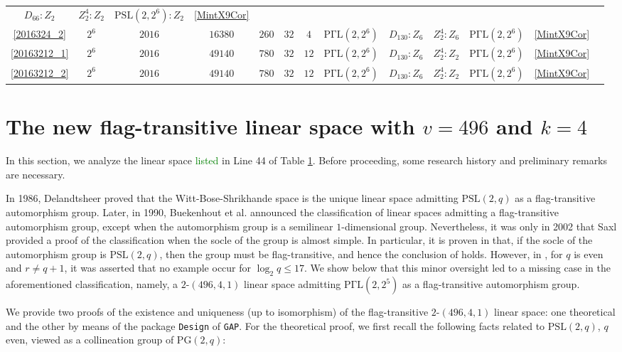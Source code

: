 \documentclass[a4paper,twopage,reqno,12pt]{amsart}
\theoremstyle{definition}
\numberwithin{equation}{section}
\newcommand{\PSL}{\mathrm{PSL}}
\newcommand{\PGaL}{\mathrm{P\Gamma L}}
\newcommand{\PG}{\mathrm{PG}}
\renewcommand{\leq}{\leqslant}
\begin{document}
\begin{table}
{\begin{tabular}{ccccccccccccc}
			$D_{66}:Z_{2}$ & $Z_{2}^{4}:Z_{2}$           & $\PSL(2,2^{6}):Z_{2}$    & \ref{MintX9Cor} \\
\ref{2016324_2}& $2 ^6$ & $2016$ & $16380$ & $260$ & $32$ & $4$      & $\PGaL(2,2^{6})$ & 
			$D_{130}:Z_{6}$ & $Z_{2}^{4}:Z_{6}$            & $\PGaL(2,2^{6})$    & \ref{MintX9Cor} \\
\ref{20163212_1}& $2 ^6$ & $2016$ & $49140$ & $780$ & $32$ & $12$      & $\PGaL(2,2^{6})$ & 
			$D_{130}:Z_{6}$ & $Z_{2}^{4}:Z_{2}$            & $\PGaL(2,2^{6})$    & \ref{MintX9Cor} \\
\ref{20163212_2}& $2 ^6$ & $2016$ & $49140$ & $780$ & $32$ & $12$      & $\PGaL(2,2^{6})$ & 
          $D_{130}:Z_{6}$ & $Z_{2}^{4}:Z_{2}$            & $\PGaL(2,2^{6})$    & \ref{MintX9Cor} \\
        \bottomrule
		\end{tabular}
	}
	\label{tab:alldesigns}
 \end{table} 

\section{The new flag-transitive linear space with $v=496$ and $k=4$}\label{Examples}
In this section, we analyze the linear space \textcolor{green}{listed} in Line 44 of Table \ref{tab:alldesigns}. Before proceeding, some research history and preliminary remarks are necessary.

In 1986, Delandtsheer \cite{De} proved that the Witt-Bose-Shrikhande space is the unique linear space admitting $\PSL(2,q)$ as a flag-transitive automorphism group. Later, in 1990, Buekenhout et al. \cite{BDDKLS} announced the classification of linear spaces admitting a flag-transitive automorphism group, except when the automorphism group is a semilinear $1$-dimensional group. Nevertheless, it was only in 2002 that Saxl \cite{Saxl} provided a proof of the classification when the socle of the group is almost simple. In particular, it is proven in \cite[Lemma 7.1]{Saxl} that, if the socle of the automorphism group is $\PSL(2,q)$,
then the group must be flag-transitive, and hence the conclusion of \cite{De} holds. However, in \cite[Lemma 7.1]{Saxl}, for $q$ is even and $r\neq q+1$, it was asserted that no example occur for $\log_{2}q \leq 17$. We show below that this minor oversight led to a missing case in the aforementioned classification, namely, a $2$-$(496,4,1)$ linear space admitting $\PGaL(2,2^5)$ as a flag-transitive automorphism group.

We provide two proofs of the existence and uniqueness (up to isomorphism) of the flag-transitive $2$-$(496,4,1)$ linear space: one theoretical and the other by means of the package \texttt{Design} of \texttt{GAP}. For the theoretical proof, we first recall the following facts related to $\PSL(2,q)$, $q$ even, viewed as a collineation group of $\PG(2,q)$:
\end{document}
